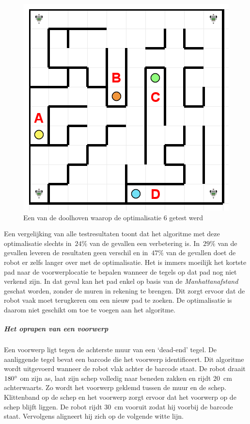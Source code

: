 \documentclass[eind]{penoverslag}
\begin{document}
\begin{figure}[!hb]
\centering
	\includegraphics[scale=0.5]{doolhof3}
	\caption{Een van de doolhoven waarop de optimalisatie 6 getest werd}
\label{fig:TestDead}
\end{figure}


Een vergelijking van alle testresultaten toont dat het algoritme met deze optimalisatie slechts in~$24\%$ van de gevallen een verbetering is. In~$29\%$ van de gevallen leveren de resultaten geen verschil en in~$47\%$ van de gevallen doet de robot er zelfs langer over met de optimalisatie. Het is immers moeilijk het kortste pad naar de voorwerplocatie te bepalen wanneer de tegels op dat pad nog niet verkend zijn. In dat geval kan het pad enkel op basis van de \textit{Manhattanafstand} geschat worden, zonder de muren in rekening te brengen. Dit zorgt ervoor dat de robot vaak moet terugkeren om een nieuw pad te zoeken. De optimalisatie is daarom niet geschikt om toe te voegen aan het algoritme. \\

\subparagraph{Het oprapen van een voorwerp}
Een voorwerp ligt tegen de achterste muur van een `dead-end' tegel. De aanliggende tegel bevat een barcode die het voorwerp identificeert. Dit algoritme wordt uitgevoerd wanneer de robot vlak achter de barcode staat. De robot draait $180\degree$ om zijn as, laat zijn schep volledig naar beneden zakken en rijdt $20$~cm achterwaarts. Zo wordt het voorwerp geklemd tussen de muur en de schep. Klittenband op de schep en het voorwerp zorgt ervoor dat het voorwerp op de schep blijft liggen. De robot rijdt $30$~cm vooruit zodat hij voorbij de barcode staat. Vervolgens aligneert hij zich op de volgende witte lijn.
\end{document}
